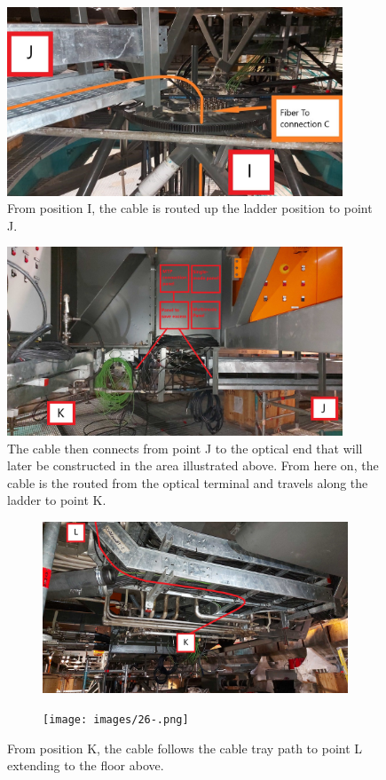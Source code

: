   \begin{figure}
    \centering
    \includegraphics[width=10cm]{images/23.jpg}
    \caption*{From position I, the cable is routed up the ladder position to point J.}
  \end{figure}
  \begin{figure}
    \centering
    \includegraphics[width=10cm]{images/24.jpg}
    \caption*{The cable then connects from point J to the optical end that will later be constructed in the area illustrated above. From here on, the cable is the routed from the optical terminal and travels along the ladder to point K.}
  \end{figure}

\newpage

  \begin{figure}
    \centering
    \begin{subfigure}{0.60\textwidth}
      \centering
      \includegraphics[width=\textwidth]{images/25.jpg}
    \end{subfigure}
    \hfill
    \begin{subfigure}{0.40\textwidth}
      \centering
      \texttt{[image: images/26-.png]}
    \end{subfigure}
    \caption*{From position K, the cable follows the cable tray path to point L extending to the floor above.}
  \end{figure}

